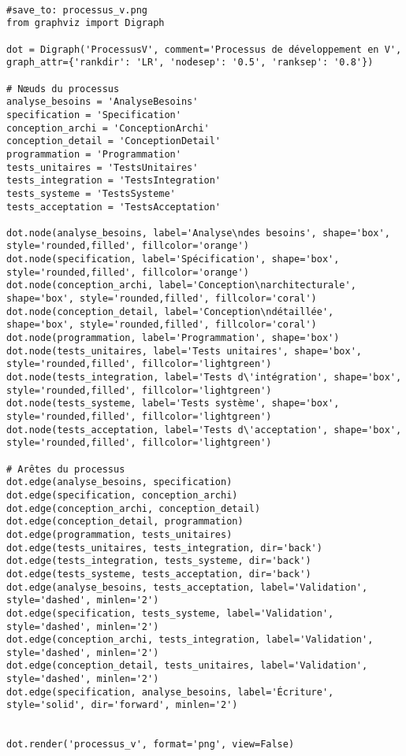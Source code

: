 \documentclass{article}
\begin{document}
\begin{verbatim}

#save_to: processus_v.png
from graphviz import Digraph

dot = Digraph('ProcessusV', comment='Processus de développement en V', graph_attr={'rankdir': 'LR', 'nodesep': '0.5', 'ranksep': '0.8'})

# Nœuds du processus
analyse_besoins = 'AnalyseBesoins'
specification = 'Specification'
conception_archi = 'ConceptionArchi'
conception_detail = 'ConceptionDetail'
programmation = 'Programmation'
tests_unitaires = 'TestsUnitaires'
tests_integration = 'TestsIntegration'
tests_systeme = 'TestsSysteme'
tests_acceptation = 'TestsAcceptation'

dot.node(analyse_besoins, label='Analyse\ndes besoins', shape='box', style='rounded,filled', fillcolor='orange')
dot.node(specification, label='Spécification', shape='box', style='rounded,filled', fillcolor='orange')
dot.node(conception_archi, label='Conception\narchitecturale', shape='box', style='rounded,filled', fillcolor='coral')
dot.node(conception_detail, label='Conception\ndétaillée', shape='box', style='rounded,filled', fillcolor='coral')
dot.node(programmation, label='Programmation', shape='box')
dot.node(tests_unitaires, label='Tests unitaires', shape='box', style='rounded,filled', fillcolor='lightgreen')
dot.node(tests_integration, label='Tests d\'intégration', shape='box', style='rounded,filled', fillcolor='lightgreen')
dot.node(tests_systeme, label='Tests système', shape='box', style='rounded,filled', fillcolor='lightgreen')
dot.node(tests_acceptation, label='Tests d\'acceptation', shape='box', style='rounded,filled', fillcolor='lightgreen')

# Arêtes du processus
dot.edge(analyse_besoins, specification)
dot.edge(specification, conception_archi)
dot.edge(conception_archi, conception_detail)
dot.edge(conception_detail, programmation)
dot.edge(programmation, tests_unitaires)
dot.edge(tests_unitaires, tests_integration, dir='back')
dot.edge(tests_integration, tests_systeme, dir='back')
dot.edge(tests_systeme, tests_acceptation, dir='back')
dot.edge(analyse_besoins, tests_acceptation, label='Validation', style='dashed', minlen='2')
dot.edge(specification, tests_systeme, label='Validation', style='dashed', minlen='2')
dot.edge(conception_archi, tests_integration, label='Validation', style='dashed', minlen='2')
dot.edge(conception_detail, tests_unitaires, label='Validation', style='dashed', minlen='2')
dot.edge(specification, analyse_besoins, label='Écriture', style='solid', dir='forward', minlen='2')


dot.render('processus_v', format='png', view=False)

\end{verbatim}
\end{document}
